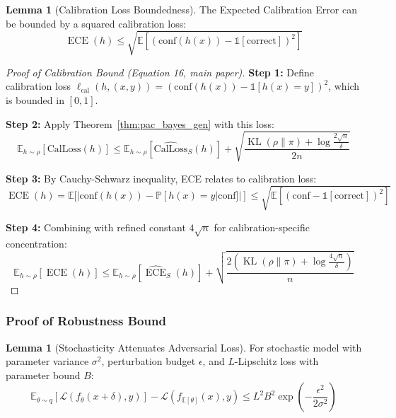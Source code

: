\documentclass[12pt,a4paper]{article}
\theoremstyle{definition}
\newtheorem{lemma}[theorem]{Lemma}
\DeclareMathOperator{\ECE}{ECE}
\DeclareMathOperator{\KL}{KL}
\begin{document}
\begin{lemma}[Calibration Loss Boundedness]
The Expected Calibration Error can be bounded by a squared calibration loss:
\begin{equation}
\ECE(h) \leq \sqrt{\mathbb{E}[(\text{conf}(h(x)) - \mathbb{1}[\text{correct}])^2]}
\end{equation}
\end{lemma}

\begin{proof}[Proof of Calibration Bound (Equation 16, main paper)]
\textbf{Step 1:} Define calibration loss $\ell_{\text{cal}}(h, (x,y)) = (\text{conf}(h(x)) - \mathbb{1}[h(x) = y])^2$, which is bounded in $[0,1]$.

\textbf{Step 2:} Apply Theorem~\ref{thm:pac_bayes_gen} with this loss:
\begin{equation}
\mathbb{E}_{h\sim\rho}[\text{CalLoss}(h)] \leq \mathbb{E}_{h\sim\rho}[\widehat{\text{CalLoss}}_S(h)] + \sqrt{\frac{\KL(\rho\|\pi) + \log\frac{2\sqrt{n}}{\delta}}{2n}}
\end{equation}

\textbf{Step 3:} By Cauchy-Schwarz inequality, ECE relates to calibration loss:
\begin{equation}
\ECE(h) = \mathbb{E}[|\text{conf}(h(x)) - \mathbb{P}[h(x)=y|\text{conf}]|] \leq \sqrt{\mathbb{E}[(\text{conf} - \mathbb{1}[\text{correct}])^2]}
\end{equation}

\textbf{Step 4:} Combining with refined constant $4\sqrt{n}$ for calibration-specific concentration:
\begin{equation}
\mathbb{E}_{h\sim\rho}[\ECE(h)] \leq \mathbb{E}_{h\sim\rho}[\widehat{\ECE}_S(h)] + \sqrt{\frac{2(\KL(\rho\|\pi) + \log\frac{4\sqrt{n}}{\delta})}{n}}
\end{equation}
\end{proof}

\subsubsection{Proof of Robustness Bound}

\begin{lemma}[Stochasticity Attenuates Adversarial Loss]
\label{lem:stochasticity_bonus}
For stochastic model with parameter variance $\sigma^2$, perturbation budget $\epsilon$, and $L$-Lipschitz loss with parameter bound $B$:
\begin{equation}
\mathbb{E}_{\theta \sim q}[\mathcal{L}(f_\theta(x+\delta), y)] - \mathcal{L}(f_{\mathbb{E}[\theta]}(x), y) \leq L^2 B^2 \exp\left(-\frac{\epsilon^2}{2\sigma^2}\right)
\end{equation}
\end{lemma}
\end{document}
